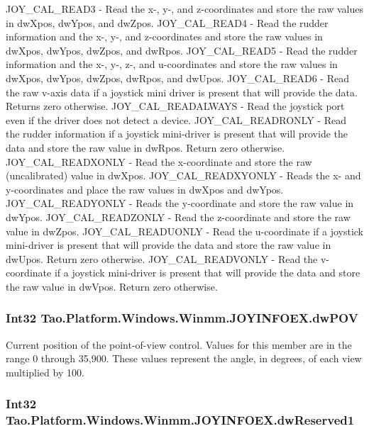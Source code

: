 JOY\_\-CAL\_\-READ3 -\/ Read the x-\/, y-\/, and z-\/coordinates and store the raw values in dwXpos, dwYpos, and dwZpos. JOY\_\-CAL\_\-READ4 -\/ Read the rudder information and the x-\/, y-\/, and z-\/coordinates and store the raw values in dwXpos, dwYpos, dwZpos, and dwRpos. JOY\_\-CAL\_\-READ5 -\/ Read the rudder information and the x-\/, y-\/, z-\/, and u-\/coordinates and store the raw values in dwXpos, dwYpos, dwZpos, dwRpos, and dwUpos. JOY\_\-CAL\_\-READ6 -\/ Read the raw v-\/axis data if a joystick mini driver is present that will provide the data. Returns zero otherwise. JOY\_\-CAL\_\-READALWAYS -\/ Read the joystick port even if the driver does not detect a device. JOY\_\-CAL\_\-READRONLY -\/ Read the rudder information if a joystick mini-\/driver is present that will provide the data and store the raw value in dwRpos. Return zero otherwise. JOY\_\-CAL\_\-READXONLY -\/ Read the x-\/coordinate and store the raw (uncalibrated) value in dwXpos. JOY\_\-CAL\_\-READXYONLY -\/ Reads the x-\/ and y-\/coordinates and place the raw values in dwXpos and dwYpos. JOY\_\-CAL\_\-READYONLY -\/ Reads the y-\/coordinate and store the raw value in dwYpos. JOY\_\-CAL\_\-READZONLY -\/ Read the z-\/coordinate and store the raw value in dwZpos. JOY\_\-CAL\_\-READUONLY -\/ Read the u-\/coordinate if a joystick mini-\/driver is present that will provide the data and store the raw value in dwUpos. Return zero otherwise. JOY\_\-CAL\_\-READVONLY -\/ Read the v-\/coordinate if a joystick mini-\/driver is present that will provide the data and store the raw value in dwVpos. Return zero otherwise. \hypertarget{struct_tao_1_1_platform_1_1_windows_1_1_winmm_1_1_j_o_y_i_n_f_o_e_x_a88d4785efdcf2a3b7c4bc3b9f6ad0fad}{
\subsubsection[{dwPOV}]{\setlength{\rightskip}{0pt plus 5cm}Int32 {\bf Tao.Platform.Windows.Winmm.JOYINFOEX.dwPOV}}}
\label{struct_tao_1_1_platform_1_1_windows_1_1_winmm_1_1_j_o_y_i_n_f_o_e_x_a88d4785efdcf2a3b7c4bc3b9f6ad0fad}


Current position of the point-\/of-\/view control. Values for this member are in the range 0 through 35,900. These values represent the angle, in degrees, of each view multiplied by 100. 

\hypertarget{struct_tao_1_1_platform_1_1_windows_1_1_winmm_1_1_j_o_y_i_n_f_o_e_x_aaf8387d045e2e946f6033c3d1b6a362e}{
\subsubsection[{dwReserved1}]{\setlength{\rightskip}{0pt plus 5cm}Int32 {\bf Tao.Platform.Windows.Winmm.JOYINFOEX.dwReserved1}}}
\label{struct_tao_1_1_platform_1_1_windows_1_1_winmm_1_1_j_o_y_i_n_f_o_e_x_aaf8387d045e2e946f6033c3d1b6a362e}


